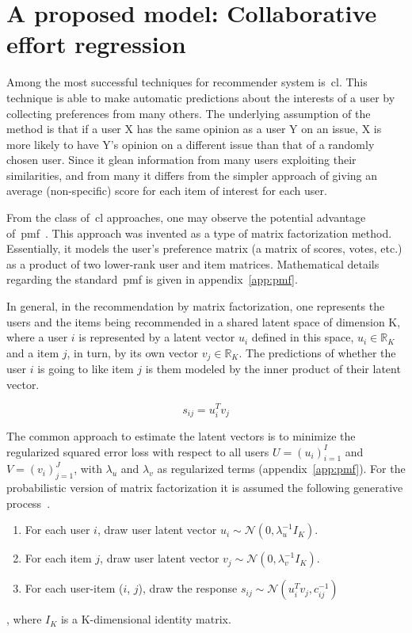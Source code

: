 \section{A proposed model: Collaborative effort regression}

Among the most successful techniques for recommender system is~\gls{cl}. This technique is able to make automatic predictions about the interests of a user by collecting preferences from many others. The underlying assumption of the method is that if a user X has the same opinion as a user Y on an issue, X is more likely to have Y's opinion on a different issue than that of a randomly chosen user. Since it glean information from many users exploiting their similarities, and from many it differs from the simpler approach of giving an average (non-specific) score for each item of interest for each user.

From the class of~\gls{cl} approaches, one may observe the potential advantage of~\gls{pmf}~\citep{mnih_probabilistic_2008}. This approach was invented as a type of matrix factorization method. Essentially, it models the user's preference matrix (a matrix of scores, votes, etc.) as a product of two lower-rank user and item matrices. Mathematical details regarding the standard~\gls{pmf} is given in appendix~\ref{app:pmf}. 

In general, in the recommendation by matrix factorization, one represents the users and the items being recommended in a shared latent space of dimension K, where a user $i$ is represented by a latent vector $u_{i}$ defined in this space, \ie $u_{i} \in \mathbb{R}_{K}$ and a item $j$, in turn, by its own vector $v_{j} \in \mathbb{R}_{K}$. The predictions of whether the user $i$ is going to like item $j$ is them modeled by the inner product of their latent vector.

\begin{equation}
    s_{ij} = u_{i}^{T}v_{j}
\end{equation}

The common approach to estimate the latent vectors is to minimize the regularized squared error loss with respect to all users $U=(u_{i})_{i=1}^{I}$ and $V=(v_{i})_{j=1}^{J}$, with $\lambda_{u}$ and $\lambda_{v}$ as regularized terms (appendix~\ref{app:pmf}). For the probabilistic version of matrix factorization it is assumed the following generative process~\citep{wang_collaborative_2011}.

\begin{enumerate}
    \item For each user $i$, draw user latent vector $u_{i} \sim \mathcal{N}(0,\lambda_{u}^{-1}I_{K})$.
    \item For each item $j$, draw user latent vector $v_{j} \sim \mathcal{N}(0,\lambda_{v}^{-1}I_{K})$.
    \item For each user-item ($i$, $j$), draw the response $s_{ij} \sim \mathcal{N}(u_{i}^{T}v_{j}, c_{ij}^{-1})$
\end{enumerate}
, where $I_{K}$ is a K-dimensional identity matrix.


